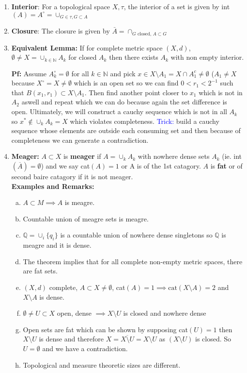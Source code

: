 \documentclass{article}
\begin{document}
\begin{enumerate} 

    \item \textbf{Interior}: For a topological space \(X, \tau\), the interior of a set is given by int \((A) = A^\circ = \cup_{G\in \tau, G\subset A}\)
    \item \textbf{Closure}: The closure is given by \(\bar A = \cap_{G \text{ closed, }A \subset G}\)

    \item \textbf{Equivalent Lemma:} If for complete metric space \((X, d)\), \(\emptyset \neq X = \cup_{k\in \mathbb{N}} A_k\) for closed \(A_k\) then there exists \(A_k\) with non empty interior.

    \textbf{Pf:} Assume \(A_k^\circ = \emptyset\) for all \(k \in \mathbb{N}\) and pick \(x \in X\setminus A_1 = X\cap A_1^c \neq \emptyset\) (\(A_1 \neq X\) because \(X^\circ = X\neq \emptyset\) which is an open set so we can find \(0<r_1<2^{-1}\) such that \(B(x_1, r_1) \subset X\setminus A_1\). Then find another point closer to \(x_1\) which is not in \(A_2\) aswell and repeat which we can do because again the set difference is open. Ultimately, we will construct a cauchy sequence which is not in all \(A_k\) so \(x^* \not \in \cup_k A_k = X\) which violates completeness. \textcolor{blue}{Trick:} build a cauchy sequence whose elements are outside each consuming set and then because of completeness we can generate a contradiction.

    \item \textbf{Meager:} \(A \subset X\) is \textbf{meager} if \(A = \cup _k A_k\) with nowhere dense sets \(A_k\) (ie. int\(\left(\overline{A}\right) = \emptyset\)) and we say cat\((A) = 1\) or A is of the 1st catagory. \(A\) is \textbf{fat} or of second baire catagory if it is not meager.\\
    \textbf{Examples and Remarks:} 
    \begin{enumerate} [a.]
        \item \(A \subset M \implies A\) is meagre.
        \item Countable union of meagre sets is meagre.
        \item \(\mathbb{Q} = \cup_i \{q_i\}\) is a countable union of nowhere dense singletons so \(\mathbb{Q}\) is meagre and it is dense.
        \item The theorem implies that for all complete non-empty metric spaces, there are fat sets.
        \item \((X, d)\) complete, \(A \subset X \neq \emptyset\), cat\((A) = 1\implies \text{cat}(X\setminus A) = 2\) and \(X\setminus A\) is dense.
        \item \(\emptyset \neq U \subset X\) open, dense \(\implies X\setminus U\) is closed and nowhere dense
        \item Open sets are fat which can be shown by supposing cat\((U) = 1\) then \(X\setminus U\) is dense and therefore \(X = \overline{X\setminus U} = X\setminus U\) as \((X\setminus U)\) is closed. So \(U = \emptyset\) and we have a contradiction.
        \item Topological and measure theoretic sizes are different.
    \end{enumerate}
    

\end{enumerate}
\end{document}
